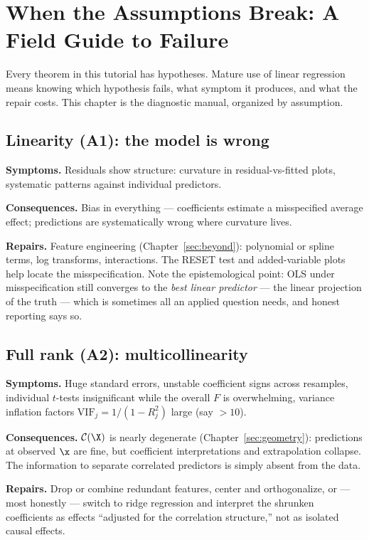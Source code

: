 \section{When the Assumptions Break: A Field Guide to Failure}\label{sec:practice}

Every theorem in this tutorial has hypotheses. Mature use of linear regression means knowing which hypothesis fails, what symptom it produces, and what the repair costs. This chapter is the diagnostic manual, organized by assumption.

\subsection{Linearity (A1): the model is wrong}

\textbf{Symptoms.} Residuals show structure: curvature in residual-vs-fitted plots, systematic patterns against individual predictors.

\textbf{Consequences.} Bias in everything — coefficients estimate a misspecified average effect; predictions are systematically wrong where curvature lives.

\textbf{Repairs.} Feature engineering (Chapter~\ref{sec:beyond}): polynomial or spline terms, log transforms, interactions. The RESET test and added-variable plots help locate the misspecification. Note the epistemological point: OLS under misspecification still converges to the \emph{best linear predictor} — the linear projection of the truth — which is sometimes all an applied question needs, and honest reporting says so.

\subsection{Full rank (A2): multicollinearity}

\textbf{Symptoms.} Huge standard errors, unstable coefficient signs across resamples, individual $t$-tests insignificant while the overall $F$ is overwhelming, variance inflation factors $\mathrm{VIF}_j = 1/(1 - R_j^2)$ large (say $> 10$).

\textbf{Consequences.} $\mathcal{C}(\X)$ is nearly degenerate (Chapter~\ref{sec:geometry}): predictions at observed $\x$ are fine, but coefficient interpretations and extrapolation collapse. The information to separate correlated predictors is simply absent from the data.

\textbf{Repairs.} Drop or combine redundant features, center and orthogonalize, or — most honestly — switch to ridge regression and interpret the shrunken coefficients as effects ``adjusted for the correlation structure,'' not as isolated causal effects.

